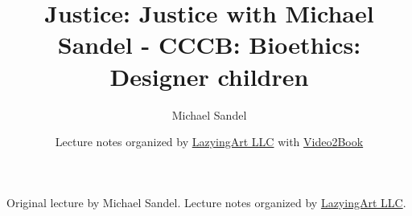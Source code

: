 \documentclass[11pt,oneside]{book}
\begin{document}
\frontmatter
\title{Justice: Justice with Michael Sandel - CCCB: Bioethics: Designer children}
\author{Michael Sandel}
\date{Lecture notes organized by \href{https://lazying.art}{LazyingArt LLC} with \href{https://github.com/lachlanchen/Video2Book}{Video2Book}}
\maketitle
\begin{center}
\small Original lecture by Michael Sandel. Lecture notes organized by \href{https://lazying.art}{LazyingArt LLC}.
\end{center}
\clearpage
\mainmatter

\end{document}
